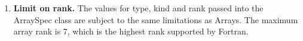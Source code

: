 

\begin{enumerate}

\item {\bf Limit on rank.}  The values for type, kind and rank passed 
into the ArraySpec
class are subject to the same limitations as Arrays.  The maximum
array rank is 7, which is the highest rank supported by Fortran.

\end{enumerate}





